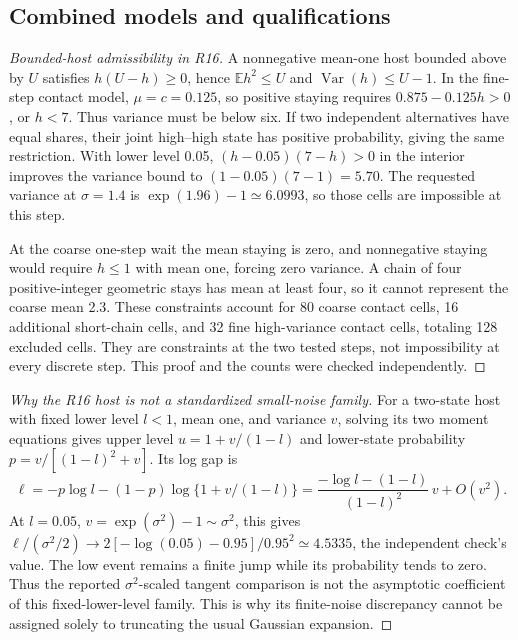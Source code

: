 \subsection{Combined models and qualifications}\label{app:mech-r16}
\begin{proof}[Bounded-host admissibility in R16]
A nonnegative mean-one host bounded above by \(U\) satisfies \(h(U-h)\geq0\), hence \(\mathbb E h^2\leq U\) and \(\operatorname{Var}(h)\leq U-1\). In the fine-step contact model, \(\mu=c=0.125\), so positive staying requires \(0.875-0.125h>0\), or \(h<7\). Thus variance must be below six. If two independent alternatives have equal shares, their joint high--high state has positive probability, giving the same restriction. With lower level 0.05, \((h-0.05)(7-h)>0\) in the interior improves the variance bound to \((1-0.05)(7-1)=5.70\). The requested variance at \(\sigma=1.4\) is \(\exp(1.96)-1\simeq6.0993\), so those cells are impossible at this step.

At the coarse one-step wait the mean staying is zero, and nonnegative staying would require \(h\leq1\) with mean one, forcing zero variance. A chain of four positive-integer geometric stays has mean at least four, so it cannot represent the coarse mean 2.3. These constraints account for 80 coarse contact cells, 16 additional short-chain cells, and 32 fine high-variance contact cells, totaling 128 excluded cells. They are constraints at the two tested steps, not impossibility at every discrete step. This proof and the counts were checked independently.
\end{proof}

\begin{proof}[Why the R16 host is not a standardized small-noise family]
For a two-state host with fixed lower level \(l<1\), mean one, and variance \(v\), solving its two moment equations gives upper level \(u=1+v/(1-l)\) and lower-state probability \(p=v/[(1-l)^2+v]\). Its log gap is
\[
 \ell=-p\log l-(1-p)\log\{1+v/(1-l)\}
 =\frac{-\log l-(1-l)}{(1-l)^2}\,v+O(v^2).
\]
At \(l=0.05\), \(v=\exp(\sigma^2)-1\sim\sigma^2\), this gives
\(\ell/(\sigma^2/2)\to2[-\log(0.05)-0.95]/0.95^2\simeq4.5335\), the independent check's value. The low event remains a finite jump while its probability tends to zero. Thus the reported \(\sigma^2\)-scaled tangent comparison is not the asymptotic coefficient of this fixed-lower-level family. This is why its finite-noise discrepancy cannot be assigned solely to truncating the usual Gaussian expansion.
\end{proof}

